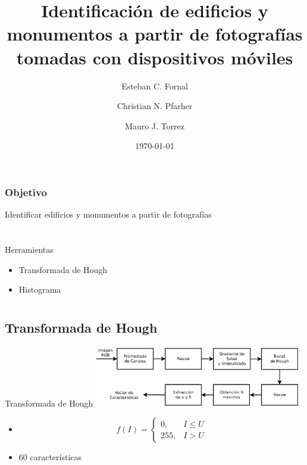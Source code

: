 \documentclass[spanish]{beamer}
\title{Identificación de edificios y monumentos a partir de fotografías tomadas 
con dispositivos móviles}
\author{Esteban C. Fornal \and Christian N. Pfarher \and Mauro J. Torrez}
\date{\today}
\begin{document}
%
\frame{\titlepage}

\section[Objetivo]{}

\begin{frame}{}
\frametitle{Objetivo}
Identificar edificios y monumentos a partir de fotografías
\end{frame}

\section[Herramientas utilizadas]{}

\begin{frame}{Herramientas}
\begin{itemize}
\item<1-> Transformada de Hough
\item<2-> Histograma
\end{itemize}
\end{frame}

\section[Técnicas utilizadas]{}
\subsection{Transformada de Hough}
\begin{frame}{Transformada de Hough}
  \includegraphics[width=9cm]{../diagramas/procesohough}

  \begin{itemize}
  \item[]\begin{center}
    \begin{equation*}
      \label{umbral}
      f(I)=
      \begin{cases}
      0, & I\leq U\\
      255, & I > U
      \end{cases}
      \end{equation*}
      \end {center}
  \item 60 características
  \end{itemize}
\end{frame}
\end{document}

